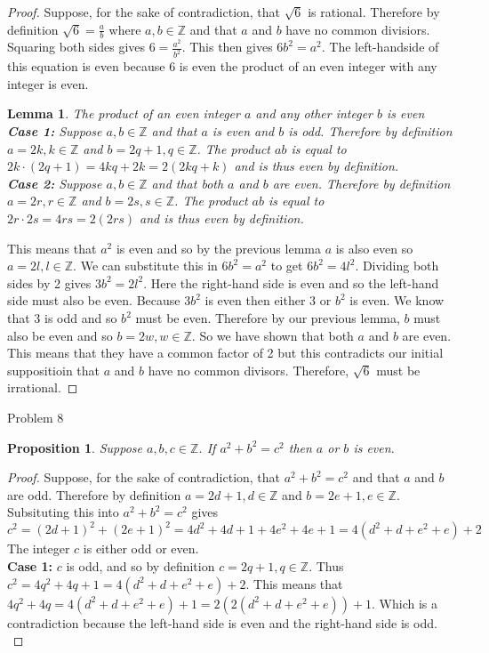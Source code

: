 \documentclass[12pt,letterpaper, onecolumn]{exam}
\newtheorem*{prop}{Proposition}
\newtheorem*{lemma}{Lemma}
\begin{document}
	\begin{proof}
		Suppose, for the sake of contradiction, that $\sqrt{6}$ is rational. Therefore by definition $\sqrt{6}=\frac{a}{b}$ where $a,b \in\mathbb{Z}$ and that $a$ and $b$ have no common divisiors. Squaring both sides gives $6=\frac{a^2}{b^2}$. This then gives $6b^2=a^2$. The left-handside of this equation is even because 6 is even the product of an even integer with any integer is even. 
		\begin{lemma}
		The product of an even integer $a$ and any other integer $b$ is even\\
		\textbf{Case 1:} Suppose $a,b\in\mathbb{Z}$ and that $a$ is even and $b$ is odd. Therefore by definition $a=2k, k\in\mathbb{Z}$ and $b=2q+1, q\in\mathbb{Z}$. The product $ab$ is equal to $2k\cdot (2q+1)=4kq+2k=2(2kq+k)$ and is thus even by definition.\\
		\textbf{Case 2:} Suppose $a,b\in\mathbb{Z}$ and that both $a$ and $b$ are even. Therefore by definition $a=2r, r\in\mathbb{Z}$ and $b=2s, s\in\mathbb{Z}$. The product $ab$ is equal to $2r\cdot2s=4rs=2(2rs)$ and is thus even by definition.
		\end{lemma}
		This means that $a^2$ is even and so by the previous lemma $a$ is also even so $a=2l, l\in\mathbb{Z}$. We can substitute this in $6b^2=a^2$ to get $6b^2=4l^2$. Dividing both sides by 2 gives $3b^2=2l^2$. Here the right-hand side is even and so the left-hand side must also be even. Because $3b^2$ is even then either $3$ or $b^2$ is even. We know that 3 is odd and so $b^2$ must be even. Therefore by our previous lemma, $b$ must also be even and so $b=2w, w\in\mathbb{Z}$. So we have shown that both $a$ and $b$ are even. This means that they have a common factor of 2 but this contradicts our initial suppositioin that $a$ and $b$ have no common divisors. Therefore, $\sqrt{6}$ must be irrational.
	\end{proof}
	\centerline{Problem 8}
		\begin{prop}
		Suppose $a,b,c\in \mathbb{Z}$. If $a^2+b^2=c^2$ then $a$ or $b$ is even.
	\end{prop}
	\begin{proof}
			Suppose, for the sake of contradiction, that $a^2+b^2=c^2$ and that $a$ and $b$ are  odd. Therefore by definition $a=2d+1,d\in\mathbb{Z}$ and $b=2e+1,e\in\mathbb{Z}$. Subsituting this into $a^2+b^2=c^2$  gives $c^2=(2d+1)^2+(2e+1)^2=4d^2+4d+1+4e^2+4e+1=4(d^2+d+e^2+e)+2$\\
			The integer $c$ is either odd or even.\\
			\textbf{Case 1:} $c$ is odd, and so by definition $c=2q+1, q\in\mathbb{Z}$. Thus $c^2=4q^2+4q+1=4(d^2+d+e^2+e)+2$. This means that $4q^2+4q=4(d^2+d+e^2+e)+1=2(2(d^2+d+e^2+e))+1$. Which is a contradiction because the left-hand side is even and the right-hand side is odd.\\
	\end{proof}
\end{document}

